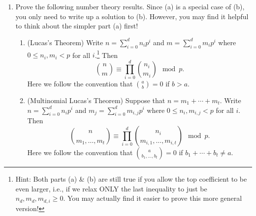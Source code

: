 \documentclass[11pt]{amsart}
\begin{document}
\begin{enumerate}[itemsep=7em]
\begin{enumerate}[itemsep=1em]
\item Conclude that the following are equivalent: 
    \begin{enumerate}
    \item $R$ is strongly $F$-regular.
    \item For every $c \in S$ not in any minimal prime of $I$, there exists $e > 0$ such that $c\not\in\mf m^{[p^e]}:(I^{[p^e]} :I)$.
    \item $\bigcap_{e> 0}\mf m^{[p^e]}:(I^{[p^e]}:I)$ is contained in the union of the minimal primes of $I$.\footnote{Fun fact: By prime avoidance, you could even restate this a fourth way and require that the intersection by contained in a single minimal prime!}
    \end{enumerate}
\end{enumerate}



\newpage

\item Prove the following number theory results. Since (a) is a special case of (b), you only need to write up a solution to (b). However, you may find it helpful to think about the simpler part (a) first!
\begin{enumerate}[itemsep=1em]
\item (Lucas's Theorem) Write $n=\sum_{i=0}^d n_i p^i$ and $m = \sum_{i=0}^d m_i p^i$ where $0\le n_i,m_i<p$ for all $i$.\footnote{Hint: Both parts (a) \& (b) are still true if you allow the top coefficient to be even larger, i.e., if we relax ONLY the last inequality to just be $n_d,m_d,m_{d,i}\ge 0$. You may actually find it easier to prove this more general version!} Then
\[
\binom{n}{m} \equiv \prod_{i=0}^d \binom{n_i}{m_i} \mod p.
\]
Here we follow the convention that $\binom{a}{b} = 0$ if $b>a$.


\item (Multinomial Lucas's Theorem) Suppose that $n = m_1+\cdots + m_t$. Write $n=\sum_{i=0}^d n_ip^i$ and $m_j = \sum_{i=0}^d m_{i,j} p^i$ where $0\le n_i,m_{i,j}<p$ for all $i$.
Then
\[
\binom{n}{m_1,\ldots, m_t} \equiv \prod_{i=0}^d \binom{n_i}{m_{i,1},\ldots, m_{i,t}} \mod p.
\]
Here we follow the convention that $\binom{a}{b_1,\ldots, b_t}=0$ if $b_1+\cdots + b_t\neq a$.

\end{enumerate}



\end{enumerate}
\end{document}
